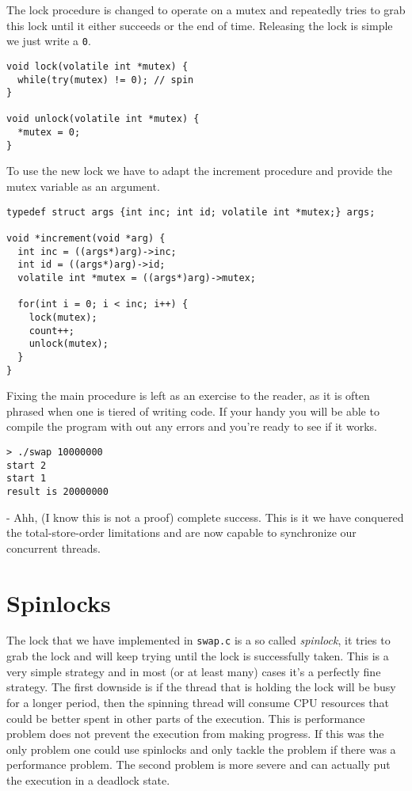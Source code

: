 \documentclass[a4paper,11pt]{article}
\begin{document}
The lock procedure is changed to operate on a mutex and repeatedly
tries to grab this lock until it either succeeds or the end of
time. Releasing the lock is simple we just write a {\tt 0}.

\begin{lstlisting}
void lock(volatile int *mutex) {
  while(try(mutex) != 0); // spin 
}

void unlock(volatile int *mutex) {
  *mutex = 0;
}
\end{lstlisting}

To use the new lock we have to adapt the increment procedure and
provide the mutex variable as an argument. 

\begin{lstlisting}
typedef struct args {int inc; int id; volatile int *mutex;} args;

void *increment(void *arg) {
  int inc = ((args*)arg)->inc;
  int id = ((args*)arg)->id;
  volatile int *mutex = ((args*)arg)->mutex;
  
  for(int i = 0; i < inc; i++) {
    lock(mutex);
    count++;
    unlock(mutex);
  }
}
\end{lstlisting}

Fixing the main procedure is left as an exercise to the reader, as it
is often phrased when one is tiered of writing code. If your handy you
will be able to compile the program with out any errors and you're
ready to see if it works.

\begin{verbatim}
> ./swap 10000000
start 2
start 1
result is 20000000
\end{verbatim}

- Ahh, (I know this is not a proof) complete success. This is it we
have conquered the total-store-order limitations and are now capable to
synchronize our concurrent threads. 

\section{Spinlocks}

The lock that we have implemented in {\tt swap.c} is a so called {\em
  spinlock}, it tries to grab the lock and will keep trying until the
lock is successfully taken. This is a very simple strategy and in most
(or at least many) cases it's a perfectly fine strategy. The first
downside is if the thread that is holding the lock will be busy for a
longer period, then the spinning thread will consume CPU resources that
could be better spent in other parts of the execution. This is
performance problem does not prevent the execution from making
progress. If this was the only problem one could use spinlocks and
only tackle the problem if there was a performance problem. The second
problem is more severe and can actually put the execution in a
deadlock state.
\end{document}
